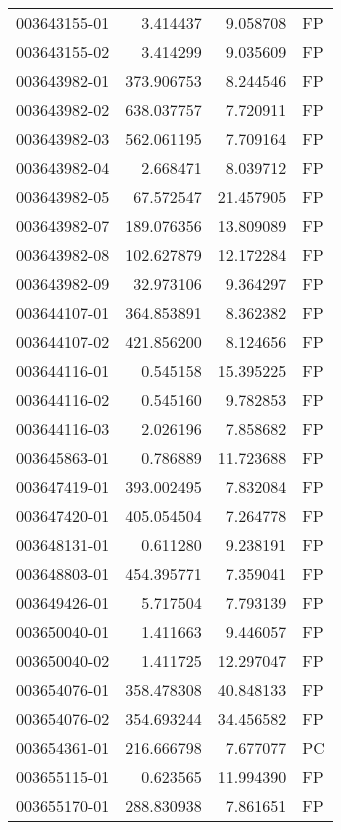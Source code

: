 \begin{tabular}{lrrl}
003643155-01 &    3.414437 &       9.058708 &   FP \\
003643155-02 &    3.414299 &       9.035609 &   FP \\
003643982-01 &  373.906753 &       8.244546 &   FP \\
003643982-02 &  638.037757 &       7.720911 &   FP \\
003643982-03 &  562.061195 &       7.709164 &   FP \\
003643982-04 &    2.668471 &       8.039712 &   FP \\
003643982-05 &   67.572547 &      21.457905 &   FP \\
003643982-07 &  189.076356 &      13.809089 &   FP \\
003643982-08 &  102.627879 &      12.172284 &   FP \\
003643982-09 &   32.973106 &       9.364297 &   FP \\
003644107-01 &  364.853891 &       8.362382 &   FP \\
003644107-02 &  421.856200 &       8.124656 &   FP \\
003644116-01 &    0.545158 &      15.395225 &   FP \\
003644116-02 &    0.545160 &       9.782853 &   FP \\
003644116-03 &    2.026196 &       7.858682 &   FP \\
003645863-01 &    0.786889 &      11.723688 &   FP \\
003647419-01 &  393.002495 &       7.832084 &   FP \\
003647420-01 &  405.054504 &       7.264778 &   FP \\
003648131-01 &    0.611280 &       9.238191 &   FP \\
003648803-01 &  454.395771 &       7.359041 &   FP \\
003649426-01 &    5.717504 &       7.793139 &   FP \\
003650040-01 &    1.411663 &       9.446057 &   FP \\
003650040-02 &    1.411725 &      12.297047 &   FP \\
003654076-01 &  358.478308 &      40.848133 &   FP \\
003654076-02 &  354.693244 &      34.456582 &   FP \\
003654361-01 &  216.666798 &       7.677077 &   PC \\
003655115-01 &    0.623565 &      11.994390 &   FP \\
003655170-01 &  288.830938 &       7.861651 &   FP \\

\end{tabular}

